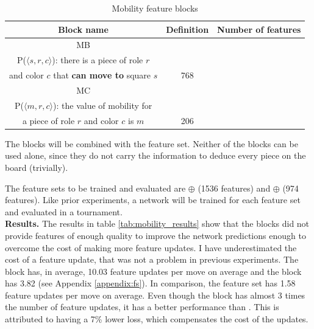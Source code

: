 \begin{table}[H]
\caption{Mobility feature blocks}
\label{tab:mobility_blocks}
\centering

\begin{tabular}{ccc}
\toprule
\bf Block name & \bf Definition & \bf Number of features \\
\toprule
MB & \makecell{
\vspace{0.2cm}
($\featureset{Squares} \times \featureset{Roles} \times \featureset{Colors})_P$ \\
P($\langle s, r, c \rangle$): there is a piece of role $r$\\ and color $c$ that \textbf{can move to} square $s$
} & 768 \\
\toprule
MC & \makecell{
\vspace{0.2cm}
$(\{0, 1, \hdots\} \times \featureset{Roles} \times \featureset{Colors})_{P}$\\
P($\langle m, r, c \rangle$): the value of mobility for\\
a piece of role $r$ and color $c$ is $m$
} & 206 \\
\bottomrule
\end{tabular}
\end{table}

The blocks will be combined with the  feature set. Neither of the blocks can be used alone, since they do not carry the information to deduce every piece on the board (trivially).

The feature sets to be trained and evaluated are  $\oplus$  (1536 features) and  $\oplus$  (974 features). Like prior experiments, a network will be trained for each feature set and evaluated in a tournament. \\

\textbf{Results.} The results in table \ref{tab:mobility_results} show that the blocks did not provide features of enough quality to improve the network predictions enough to overcome the cost of making more feature updates. I have underestimated the cost of a feature update, that was not a problem in previous experiments. The block  has, in average, 10.03 feature updates per move on average and the block  has 3.82 (see Appendix \ref{appendix:fs}). In comparison, the  feature set has 1.58 feature updates per move on average. Even though the block  has almost 3 times the number of feature updates, it has a better performance than . This is attributed to having a 7\% lower loss, which compensates the cost of the updates. \\

